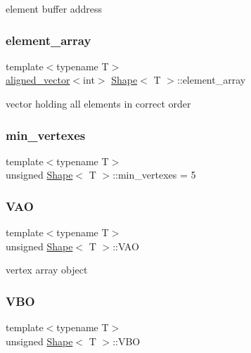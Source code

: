element buffer address \mbox{\label{classShape_accef3084e7e3897e01806b90da0a0ec8}} 
\subsubsection{\texorpdfstring{element\+\_\+array}{element\_array}}
{\footnotesize\ttfamily template$<$typename T$>$ \\
\mbox{\hyperlink{type__definitions_8hpp_accb98a876f193a416d9c8a02fe22d526}{aligned\+\_\+vector}}$<$int$>$ \mbox{\hyperlink{classShape}{Shape}}$<$ T $>$\+::element\+\_\+array\hspace{0.3cm}{\ttfamily [protected]}}

vector holding all elements in correct order \mbox{\label{classShape_acb30d3bdd3434dc2cb3074a4d61985ed}} 
\subsubsection{\texorpdfstring{min\+\_\+vertexes}{min\_vertexes}}
{\footnotesize\ttfamily template$<$typename T$>$ \\
unsigned \mbox{\hyperlink{classShape}{Shape}}$<$ T $>$\+::min\+\_\+vertexes = 5\hspace{0.3cm}{\ttfamily [protected]}}

\mbox{\label{classShape_a30771567edd66db5d14dc630f2d63f82}} 
\subsubsection{\texorpdfstring{V\+AO}{VAO}}
{\footnotesize\ttfamily template$<$typename T$>$ \\
unsigned \mbox{\hyperlink{classShape}{Shape}}$<$ T $>$\+::V\+AO\hspace{0.3cm}{\ttfamily [protected]}}

vertex array object \mbox{\label{classShape_a5ca89aadcd89bb475d6ca88acf733ce6}} 
\subsubsection{\texorpdfstring{V\+BO}{VBO}}
{\footnotesize\ttfamily template$<$typename T$>$ \\
unsigned \mbox{\hyperlink{classShape}{Shape}}$<$ T $>$\+::V\+BO\hspace{0.3cm}{\ttfamily [protected]}}

